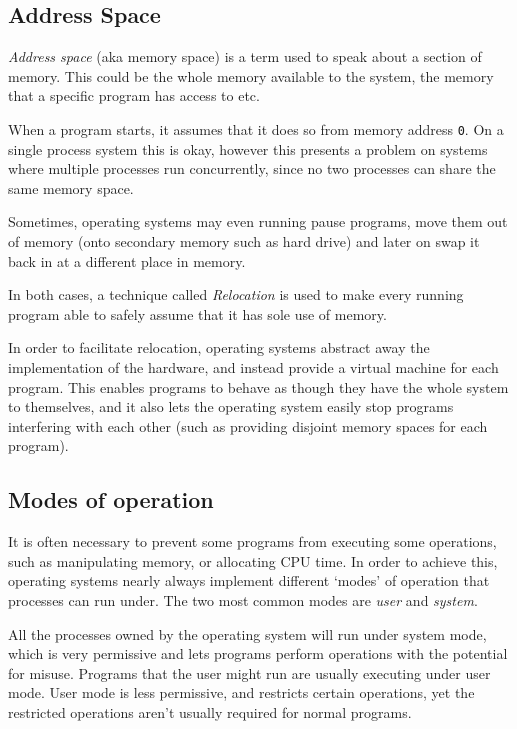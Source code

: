 
\subsection{Address Space}

\textit{Address space} (aka memory space) is a term used to speak about a
section of memory. This could be the whole memory available to the system, the
memory that a specific program has access to etc.

When a program starts, it assumes that it does so from memory address {\tt 0}.
On a single process system this is okay, however this presents a problem on
systems where multiple processes run concurrently, since no two processes can
share the same memory space.

Sometimes, operating systems may even running pause programs, move them out of
memory (onto secondary memory such as hard drive) and later on swap it back in
at a different place in memory.

In both cases, a technique called {\it Relocation} is used to make every running
program able to safely assume that it has sole use of memory.

In order to facilitate relocation, operating systems abstract away the
implementation of the hardware, and instead provide a virtual machine for each
program. This enables programs to behave as though they have the whole system
to themselves, and it also lets the operating system easily stop programs
interfering with each other (such as providing disjoint memory spaces for each
program).

\subsection{Modes of operation}

It is often necessary to prevent some programs from executing some operations,
such as manipulating memory, or allocating CPU time. In order to achieve this,
operating systems nearly always implement different `modes' of operation that
processes can run under. The two most common modes are \textit{user} and
\textit{system}.

All the processes owned by the operating system will run under system mode,
which is very permissive and lets programs perform operations with the
potential for misuse. Programs that the user might run are usually executing
under user mode. User mode is less permissive, and restricts certain
operations, yet the restricted operations aren't usually required for normal
programs.

